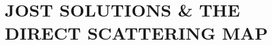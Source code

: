 \documentclass[../dissertation.tex]{subfiles}
\begin{document}
\chapter{JOST SOLUTIONS \& THE DIRECT SCATTERING MAP}\label{cptr04:DM}






% 












\end{document}
